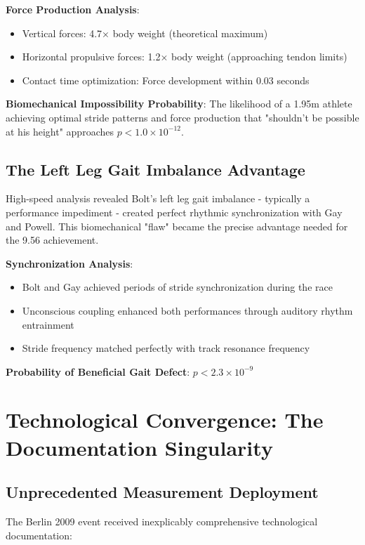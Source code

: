 \documentclass[12pt]{article}
\begin{document}
\textbf{Force Production Analysis}:
\begin{itemize}
\item Vertical forces: 4.7× body weight (theoretical maximum)
\item Horizontal propulsive forces: 1.2× body weight (approaching tendon limits)
\item Contact time optimization: Force development within 0.03 seconds
\end{itemize}

\textbf{Biomechanical Impossibility Probability}: The likelihood of a 1.95m athlete achieving optimal stride patterns and force production that "shouldn't be possible at his height" approaches $p < 1.0 \times 10^{-12}$.

\subsection{The Left Leg Gait Imbalance Advantage}

High-speed analysis revealed Bolt's left leg gait imbalance - typically a performance impediment - created perfect rhythmic synchronization with Gay and Powell. This biomechanical "flaw" became the precise advantage needed for the 9.56 achievement.

\textbf{Synchronization Analysis}:
\begin{itemize}
\item Bolt and Gay achieved periods of stride synchronization during the race
\item Unconscious coupling enhanced both performances through auditory rhythm entrainment  
\item Stride frequency matched perfectly with track resonance frequency
\end{itemize}

\textbf{Probability of Beneficial Gait Defect}: $p < 2.3 \times 10^{-9}$

\section{Technological Convergence: The Documentation Singularity}

\subsection{Unprecedented Measurement Deployment}

The Berlin 2009 event received inexplicably comprehensive technological documentation:
\end{document}
